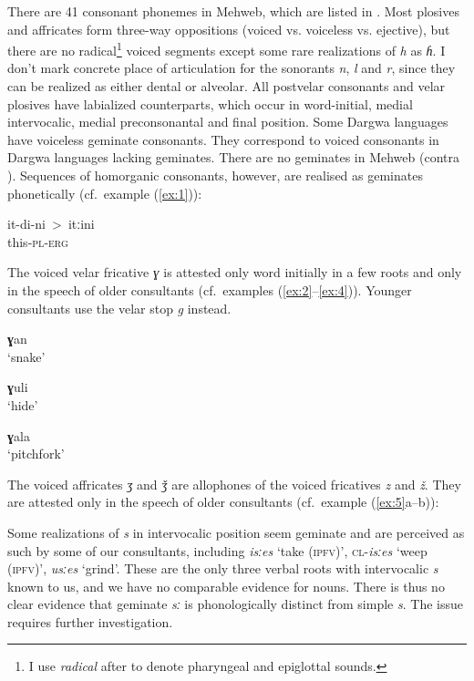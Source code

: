\documentclass[output=paper]{langsci/langscibook}
\begin{document}
There are 41 consonant phonemes in Mehweb, which are listed in .
Most plosives and affricates form three-way oppositions (voiced vs.
voiceless vs. ejective), but there are no radical\footnote{I use
  \emph{radical} after \citet{ladefoged1996}  %
  to denote pharyngeal and epiglottal sounds.} voiced segments except some rare realizations
of \emph{h} as \emph{ɦ}. I don't mark concrete place of articulation for the
sonorants \emph{n}, \emph{l} and \emph{r}, since they ​ can be realized as either dental or alveolar. All postvelar consonants and velar plosives have
labialized counterparts, which occur in word-initial, medial
intervocalic, medial preconsonantal and final position. Some Dargwa
languages have voiceless geminate consonants. They correspond to voiced
consonants in Dargwa languages lacking geminates. There are no geminates
in Mehweb (contra \citealt[8]{magometov1982}).   Sequences of homorganic
consonants, however, are realised as geminates phonetically (cf.\ example (\ref{ex:1})):

\ea \label{ex:1}
\gll it-di-ni~{\upshape\textgreater}~itːini\\
this-\textsc{pl}-\textsc{erg}\\
\z

The voiced velar fricative \emph{ɣ} is attested only word initially in a
few roots and only in the speech of older consultants (cf.\ examples
(\ref{ex:2}–\ref{ex:4})). Younger consultants use the velar stop \emph{g} instead.

\ea \label{ex:2} %
\textbf{ɣ}an\\ 
\glt `snake' 

\ex \label{ex:3} %
\textbf{ɣ}uli\\
\glt `hide'

\ex \label{ex:4} %
 \textbf{ɣ}ala\\
\glt `pitchfork'
\z

The voiced affricates \emph{ʒ} and \emph{ǯ} are allophones of the voiced
fricatives \emph{z} and \emph{ž}. They are attested only in the speech
of older consultants (cf.\ example (\ref{ex:5}a–b)):

\ea \label{ex:5} %
\ea {}
%
\exsameline %
\z
\z

Some realizations of \emph{s} in intervocalic position seem geminate and are 
perceived as such by some of our consultants, including 
\emph{isːes} `take (\textsc{ipfv})', \textsc{cl}-\emph{isːes} `weep (\textsc{ipfv})', 
\emph{usːes} `grind'. These are the only  three verbal roots with intervocalic \emph{s} known to us, 
and we have no comparable evidence for nouns. There is thus no clear evidence that geminate 
\emph{sː} is phonologically distinct from simple
\emph{s}. The issue requires further investigation.
\end{document}
